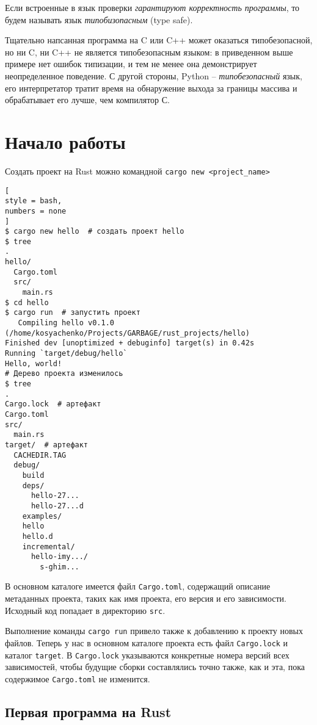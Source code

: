 \documentclass[%
	11pt,
	a4paper,
	utf8,
		]{article}
\begin{document}
Если встроенные в язык проверки \emph{гарантируют корректность программы}, то будем называть язык \emph{типобизопасным} (type safe).

Тщательно напсанная программа на C или C++ может оказаться типобезопасной, {\color{red}но ни C, ни C++ не является типобезопасным языком}: в приведенном выше примере нет ошибок типизации, и тем не менее она демонстрирует неопределенное поведение. С другой стороны, {\color{blue}Python -- \emph{типобезопасный} язык}, его интерпретатор тратит время на обнаружение выхода за границы массива и обрабатывает его лучше, чем компилятор С.

\section{Начало работы}

Создать проект на Rust можно командной \texttt{cargo new <project\_name>}
\begin{lstlisting}[
style = bash,
numbers = none	
]
$ cargo new hello  # создать проект hello
$ tree 
.
hello/
  Cargo.toml
  src/
    main.rs
$ cd hello
$ cargo run  # запустить проект
   Compiling hello v0.1.0 (/home/kosyachenko/Projects/GARBAGE/rust_projects/hello)
Finished dev [unoptimized + debuginfo] target(s) in 0.42s
Running `target/debug/hello`
Hello, world!
# Дерево проекта изменилось
$ tree
.
Cargo.lock  # артефакт
Cargo.toml
src/
  main.rs
target/  # артефакт
  CACHEDIR.TAG
  debug/
    build
    deps/
      hello-27...
      hello-27...d
    examples/
    hello
    hello.d
    incremental/
      hello-imy.../
        s-ghim...
\end{lstlisting}

В основном каталоге имеется файл \texttt{Cargo.toml}, содержащий описание метаданных проекта, таких как имя проекта, его версия и его зависимости. Исходный код попадает в директорию \texttt{src}.

Выполнение команды \texttt{cargo run} привело также к добавлению к проекту новых файлов. Теперь у нас в основном каталоге проекта есть файл \texttt{Cargo.lock} и каталог \texttt{target}. В \texttt{Cargo.lock} указываются конкретные номера версий всех зависимостей, чтобы будущие сборки составлялись точно также, как и эта, пока содержимое \texttt{Cargo.toml} не изменится.

\subsection{Первая программа на Rust}
\end{document}
